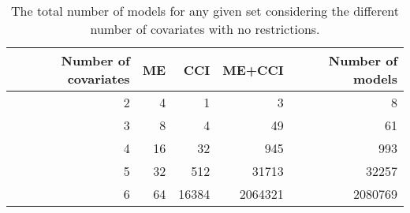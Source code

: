 \begin{table}[!h]
\centering
\caption{The total number of models for any given set considering the different number of covariates with no restrictions.} 
\begin{tabular}{rrrrr}
  \hline
Number of covariates & ME & CCI & ME+CCI & Number of models \\ 
  \hline
2 & 4 & 1 & 3 & 8 \\ 
  3 & 8 & 4 & 49 & 61 \\ 
  4 & 16 & 32 & 945 & 993 \\ 
  5 & 32 & 512 & 31713 & 32257 \\ 
  6 & 64 & 16384 & 2064321 & 2080769 \\ 
   \hline
\end{tabular}
\end{table}
